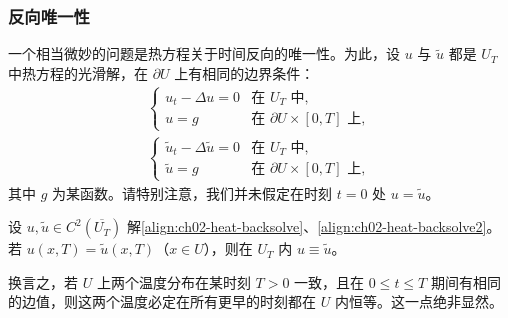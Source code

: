 \documentclass[../../main.tex]{subfiles}
\begin{document}
\subsubsection{反向唯一性}

一个相当微妙的问题是热方程关于时间反向的唯一性。为此，设 $u$ 与 $\widetilde{u}$ 都是 $U_T$ 中热方程的光滑解，在 $\partial U$ 上有相同的边界条件：
\begin{align}\label{align:ch02-heat-backsolve}
\begin{cases}
u_t-\Delta u=0 & \text{在 }U_T\text{ 中},\\
u=g & \text{在 }\partial U\times[0,T]\text{ 上},
\end{cases}
\end{align}
\begin{align}\label{align:ch02-heat-backsolve2}
\begin{cases}
\widetilde{u}_t-\Delta\widetilde{u}=0 & \text{在 }U_T\text{ 中},\\
\widetilde{u}=g & \text{在 }\partial U\times[0,T]\text{ 上},
\end{cases}
\end{align}
其中 $g$ 为某函数。请特别注意，我们并未假定在时刻 $t=0$ 处 $u=\widetilde{u}$。

\begin{theorem}[反向唯一性]\label{theorem:ch02-heat-backs-unique}设 $u,\widetilde{u}\in C^2(\overline{U_T})$ 解\eqref{align:ch02-heat-backsolve}、\eqref{align:ch02-heat-backsolve2}。若 $u(x,T)=\widetilde{u}(x,T)$（$x\in U$），则在 $U_T$ 内 $u\equiv\widetilde{u}$。
\end{theorem}

换言之，若 $U$ 上两个温度分布在某时刻 $T>0$ 一致，且在 $0\leqslant t\leqslant T$ 期间有相同的边值，则这两个温度必定在所有更早的时刻都在 $U$ 内恒等。这一点绝非显然。
\end{document}
